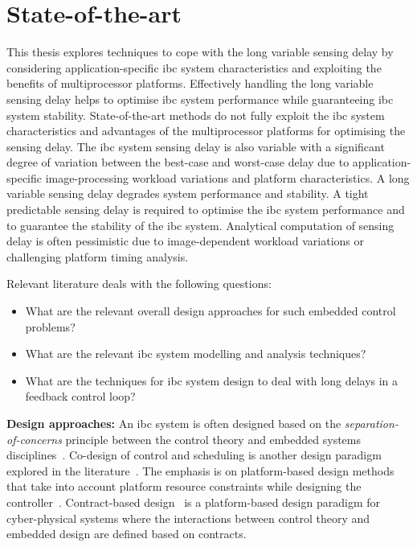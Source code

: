 \section{State-of-the-art}
\label{sec:sota}
This thesis explores techniques to cope with the long variable sensing delay by considering application-specific \gls{ibc} system characteristics and exploiting the benefits of multiprocessor platforms. Effectively handling the long variable sensing delay helps to optimise \gls{ibc} system performance while guaranteeing \gls{ibc} system stability.
State-of-the-art methods do not fully exploit the \gls{ibc} system characteristics and advantages of the multiprocessor platforms for optimising the sensing delay. The \gls{ibc} system sensing delay is also variable with a significant degree of variation between the best-case and worst-case delay due to application-specific image-processing workload variations and platform characteristics. A long variable sensing delay degrades system performance and stability. A tight predictable sensing delay is required to optimise the \gls{ibc} system performance and to guarantee the stability of the \gls{ibc} system. Analytical computation of sensing delay is often pessimistic due to image-dependent workload variations or challenging platform timing analysis.

Relevant literature deals with the following questions: 
\begin{itemize}
    \item What are the relevant overall design approaches for such embedded control problems? 
    \item What are the relevant \gls{ibc} system modelling and analysis techniques?
    \item What are the techniques for \gls{ibc} system design to deal with long delays in a feedback control loop?
\end{itemize}

\noindent\textbf{Design approaches:} An \gls{ibc} system is often designed based on the \emph{separation-of-concerns} principle between the control theory and embedded systems disciplines~\cite{arzen2000introduction,saidi2018future}.
Co-design of control and scheduling is another design paradigm explored in the literature~\cite{cervin2003does}.
The emphasis is on platform-based design methods that take into account platform resource constraints while designing the controller~\cite{arzen2000introduction,goswami2013multirate}.
Contract-based design~\cite{sangiovanni2012taming} is a platform-based design paradigm for cyber-physical systems where the interactions between control theory and embedded design are defined based on contracts.

